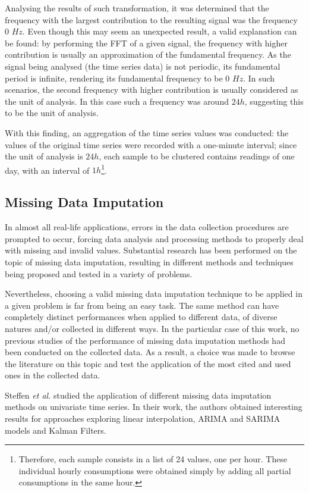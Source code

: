 \documentclass[9pt,journal,compsoc]{IEEEtran}
\begin{document}
Analysing the results of such transformation, it was determined that the frequency with the largest contribution to the resulting signal was the frequency 0 $Hz$. Even though this may seem an unexpected result, a valid explanation can be found: by performing the FFT of a given signal, the frequency with higher contribution is usually an approximation of the fundamental frequency. As the signal being analysed (the time series data) is not periodic, its fundamental period is infinite, rendering its fundamental frequency to be 0 $Hz$. In such scenarios, the second frequency with higher contribution is usually considered as the unit of analysis. In this case such a frequency was around $24h$, suggesting this to be the unit of analysis.

With this finding, an aggregation of the time series values was conducted: the values of the original time series were recorded with a one-minute interval; since the unit of analysis is $24h$, each sample to be clustered contains readings of one day, with an interval of $1h$\footnote{Therefore, each sample consists in a list of 24 values, one per hour. These individual hourly consumptions were obtained simply by adding all partial consumptions in the same hour.}.

\subsection{Missing Data Imputation}

In almost all real-life applications, errors in the data collection procedures are prompted to occur, forcing data analysis and processing methods to properly deal with missing and invalid values. Substantial research has been performed on the topic of missing data imputation, resulting in different methods and techniques being proposed and tested in a variety of problems.

Nevertheless, choosing a valid missing data imputation technique to be applied in a given problem is far from being an easy task. The same method can have completely distinct performances when applied to different data, of diverse natures and/or collected in different ways. In the particular case of this work, no previous studies of the performance of missing data imputation methods had been conducted on the collected data. As a result, a choice was made to browse the literature on this topic and test the application of the most cited and used ones in the collected data.

Steffen \emph{et al.}\cite{moritz2015comparison} studied the application of different missing data imputation methods on univariate time series. In their work, the authors obtained interesting results for approaches exploring linear interpolation, ARIMA and SARIMA models and Kalman Filters. 
\end{document}
